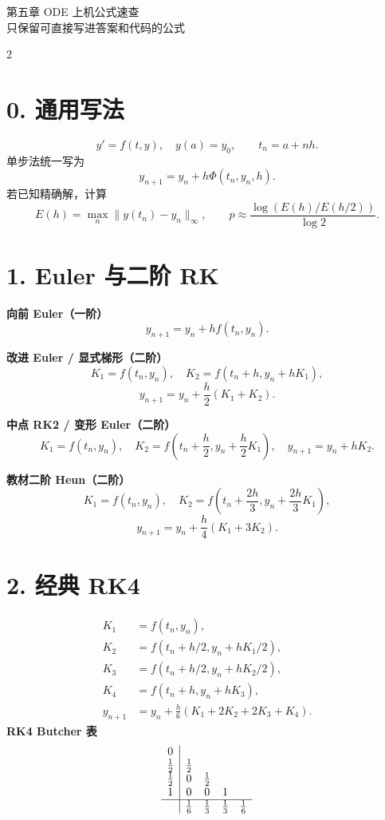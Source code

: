 \documentclass[10pt,a4paper]{ctexart}
\begin{document}
\begin{center}
  {\LARGE 第五章 ODE 上机公式速查}\\
  \small 只保留可直接写进答案和代码的公式
\end{center}

\begin{multicols}{2}
\section*{0. 通用写法}
\[
y'=f(t,y),\quad y(a)=y_0,\qquad t_n=a+nh.
\]
单步法统一写为
\[
y_{n+1}=y_n+h\Phi(t_n,y_n,h).
\]
若已知精确解，计算
\[
E(h)=\max_n\|y(t_n)-y_n\|_\infty,\qquad
p\approx\frac{\log(E(h)/E(h/2))}{\log 2}.
\]

\section*{1. Euler 与二阶 RK}
\textbf{向前 Euler（一阶）}
\[
y_{n+1}=y_n+h f(t_n,y_n).
\]

\textbf{改进 Euler / 显式梯形（二阶）}
\[
K_1=f(t_n,y_n),\quad
K_2=f(t_n+h,y_n+hK_1),
\]
\[
y_{n+1}=y_n+\frac h2(K_1+K_2).
\]

\textbf{中点 RK2 / 变形 Euler（二阶）}
\[
K_1=f(t_n,y_n),\quad
K_2=f\left(t_n+\frac h2,y_n+\frac h2K_1\right),
\quad y_{n+1}=y_n+hK_2.
\]

\textbf{教材二阶 Heun（二阶）}
\[
K_1=f(t_n,y_n),\quad
K_2=f\left(t_n+\frac{2h}{3},y_n+\frac{2h}{3}K_1\right),
\]
\[
y_{n+1}=y_n+\frac h4(K_1+3K_2).
\]

\section*{2. 经典 RK4}
\[
\begin{aligned}
K_1&=f(t_n,y_n),\\
K_2&=f(t_n+h/2,y_n+hK_1/2),\\
K_3&=f(t_n+h/2,y_n+hK_2/2),\\
K_4&=f(t_n+h,y_n+hK_3),\\
y_{n+1}&=y_n+\frac h6(K_1+2K_2+2K_3+K_4).
\end{aligned}
\]
\textbf{RK4 Butcher 表}
\[
\begin{array}{c|cccc}
0\\
\frac12&\frac12\\
\frac12&0&\frac12\\
1&0&0&1\\ \hline
&\frac16&\frac13&\frac13&\frac16
\end{array}
\]


\end{multicols}
\end{document}
